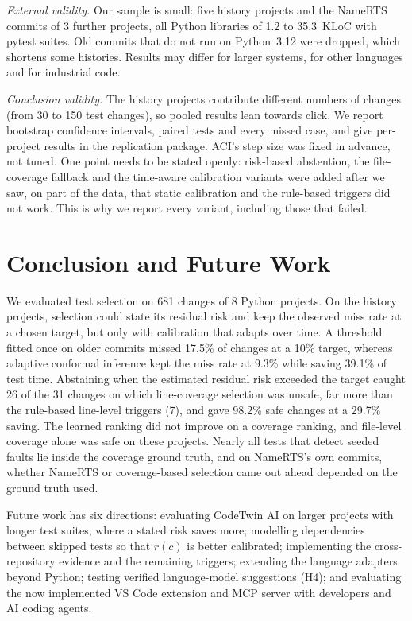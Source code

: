 \documentclass[conference]{IEEEtran}
\begin{document}
\textit{External validity.} Our sample is small: five history projects and the NameRTS commits of 3 further projects, all Python libraries of 1.2 to 35.3~KLoC with pytest suites. Old commits that do not run on Python~3.12 were dropped, which shortens some histories. Results may differ for larger systems, for other languages and for industrial code.

\textit{Conclusion validity.} The history projects contribute different numbers of changes (from 30 to 150 test changes), so pooled results lean towards click. We report bootstrap confidence intervals, paired tests and every missed case, and give per-project results in the replication package. ACI's step size was fixed in advance, not tuned. One point needs to be stated openly: risk-based abstention, the file-coverage fallback and the time-aware calibration variants were added after we saw, on part of the data, that static calibration and the rule-based triggers did not work. This is why we report every variant, including those that failed.

\section{Conclusion and Future Work}\label{sec:conclusion}
We evaluated test selection on 681 changes of 8 Python projects. On the history projects, selection could state its residual risk and keep the observed miss rate at a chosen target, but only with calibration that adapts over time. A threshold fitted once on older commits missed 17.5\% of changes at a 10\% target, whereas adaptive conformal inference kept the miss rate at 9.3\% while saving 39.1\% of test time. Abstaining when the estimated residual risk exceeded the target caught 26 of the 31 changes on which line-coverage selection was unsafe, far more than the rule-based line-level triggers (7), and gave 98.2\% safe changes at a 29.7\% saving. The learned ranking did not improve on a coverage ranking, and file-level coverage alone was safe on these projects. Nearly all tests that detect seeded faults lie inside the coverage ground truth, and on NameRTS's own commits, whether NameRTS or coverage-based selection came out ahead depended on the ground truth used.

Future work has six directions: evaluating CodeTwin AI on larger projects with longer test suites, where a stated risk saves more; modelling dependencies between skipped tests so that $r(c)$ is better calibrated; implementing the cross-repository evidence and the remaining triggers; extending the language adapters beyond Python; testing verified language-model suggestions (H4); and evaluating the now implemented VS Code extension and MCP server with developers and AI coding agents.
\end{document}
